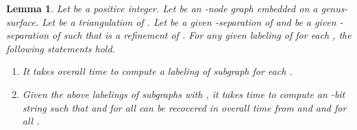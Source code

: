 \documentclass[12pt]{article}
\newtheorem{lemma}{Lemma}[section]
\begin{document}
\begin{lemma}
\label{lemma:recovery}
Let  be a positive integer.  Let  be an -node graph embedded
on a genus- surface.  Let  be a
triangulation of .  Let  be a given
-separation of  and  be a
given -separation of  such that  is a
refinement of .  For any given labeling  of
 for each , the following statements hold.
\begin{enumerate}
\addtolength{\itemsep}{-0.5\baselineskip}
\item 
\label{rec1}
It takes overall  time to compute a labeling  of
subgraph  for each .

\item 
\label{rec2}
Given the above labelings  of subgraphs  with
, it takes  time to compute an -bit string
 such that  and  for all
 can be recovered in overall  time from
 and  and  for all .
\end{enumerate}
\end{lemma}
\end{document}

